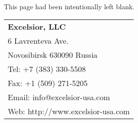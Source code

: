 \ifonline\else

\cleardoublepage
\thispagestyle{empty}
\vspace*{\fill}
\begin{center}This page had been intentionally left blank.\end{center}
\vspace*{\fill}
\pagebreak
\thispagestyle{empty}
\vspace*{\fill}
\begin{flushright}
\begin{tabular}{|l}
\bf Excelsior, LLC \\
6 Lavrenteva Ave. \\
Novosibirsk 630090 Russia \\
Tel: +7 (383) 330-5508 \\
Fax: +1 (509) 271-5205 \\
Email: info@excelsior-usa.com \\
Web: http://www.excelsior-usa.com \\
\end{tabular}
\end{flushright}

\fi